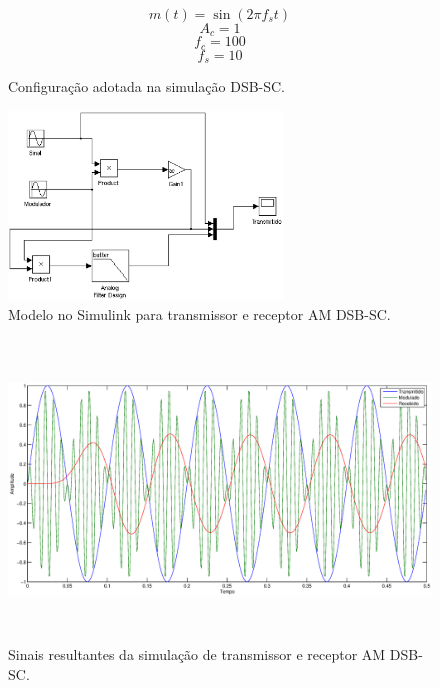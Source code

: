 \documentclass{article}
\begin{document}
\begin{figure}[h]
\centering
\begin{equation}
m(t)=\sin(2\pi f_st)
\end{equation}
\begin{equation}
A_c=1
\end{equation}
\begin{equation}
f_c=100
\end{equation}
\begin{equation}
f_s=10
\end{equation}
\caption{Configuração adotada na simulação DSB-SC.}
\label{fig:dsb-sc_conf}
\end{figure}

\begin{figure}[h]
   \centering
   \includegraphics[height=5cm]{dsb-sc_model}
   \caption{Modelo no Simulink para transmissor e receptor AM DSB-SC.}
   \label{fig:dsb-sc_model}
\end{figure}
\begin{figure}[h]
   \centering
   \includegraphics[height=8cm]{dsb-sc_result}
   \caption{Sinais resultantes da simulação de transmissor e receptor AM DSB-SC.}
   \label{fig:dsb-sc_result}
\end{figure}



\end{document}
